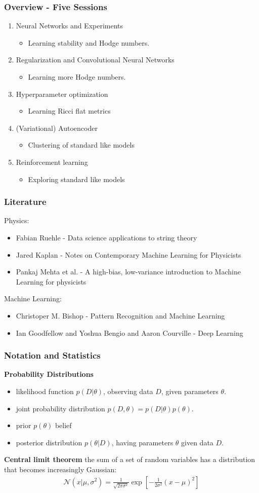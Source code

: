 \documentclass{beamer}
\newcommand{\bi}{\begin{itemize}}
\newcommand{\ei}{\end{itemize}}
\begin{document}
\begin{frame}
\frametitle{Overview - Five Sessions}
\begin{enumerate}
	\item Neural Networks and Experiments
	\bi \item Learning stability and Hodge numbers. \ei
	\item Regularization and Convolutional Neural Networks
	\bi \item Learning more Hodge numbers. \ei
	\item Hyperparameter optimization
	\bi \item Learning Ricci flat metrics \ei
	\item (Variational) Autoencoder
	\bi \item Clustering of standard like models \ei
	\item Reinforcement learning
	\bi \item Exploring standard like models \ei
\end{enumerate}
\end{frame}

\begin{frame}
\frametitle{Literature}
Physics:
\begin{itemize}
	\item Fabian Ruehle - Data science applications to string theory
	\item Jared Kaplan - Notes on Contemporary Machine Learning for Physicists
	\item Pankaj Mehta et al. - A high-bias, low-variance introduction to Machine Learning for physicists
\ei
\pause 
Machine Learning:
\bi	
	\item Christoper M. Bishop - Pattern Recognition and Machine Learning
	\item Ian Goodfellow and Yoshua Bengio and Aaron Courville - Deep Learning
\end{itemize}
\end{frame}


\begin{frame}
\frametitle{Notation and Statistics}
\textbf{Probability Distributions}
\begin{itemize}
	\item likelihood function $p(D| \theta)$, observing data $D$, given parameters $\theta$.
	\item joint probability distribution $p(D, \theta) = p(D| \theta) p(\theta)$.
	\item prior $p(\theta)$ belief %
	\item posterior distribution $p(\theta | D)$, having parameters $\theta$ given data $D$.
\end{itemize}
\pause \textbf{Central limit theorem} the sum of a set of random variables has a distribution that becomes increasingly Gaussian:
\begin{align}
\mathcal{N} (x|\mu, \sigma^2) = \frac{1}{\sqrt{2 \pi \sigma^2}} \exp \left[ - \frac{1}{2 \sigma^2} (x-\mu)^2 \right]
\end{align}
\end{frame}
\end{document}
